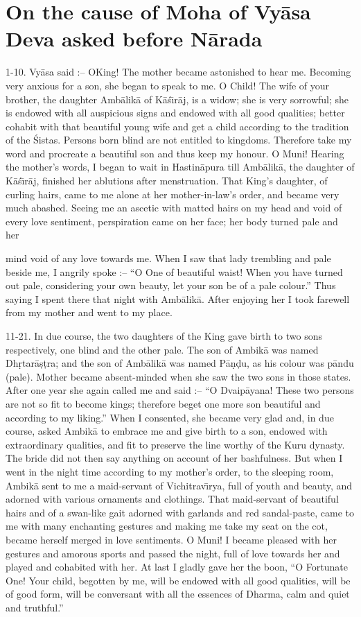 \chapter{On the cause of Moha of Vy\=asa Deva asked before N\=arada}

1-10. Vy\=asa said :-- OKing! The mother became astonished to hear me. Becoming very anxious for a son, she began to speak to me. O Child! The wife of your brother, the daughter Amb\=alik\=a of K\=a\'s\={\i}r\=aj, is a widow; she is very sorrowful; she is endowed with all auspicious signs and endowed with all good qualities; better cohabit with that beautiful young wife and get a child according to the tradition of the \'Sistas. Persons born blind are not entitled to kingdoms. Therefore take my word and procreate a beautiful son and thus keep my honour. O Muni! Hearing the mother's words, I began to wait in Hastin\=apura till Amb\=alik\=a, the daughter of K\=a\'s\={\i}r\=aj, finished her ablutions after menstruation. That King's daughter, of curling hairs, came to me alone at her mother-in-law's order, and became very much abashed. Seeing me an ascetic with matted hairs on my head and void of every love sentiment, perspiration came on her face; her body turned pale and her

mind void of any love towards me. When I saw that lady trembling and pale beside me, I angrily spoke :-- ``O One of beautiful waist! When you have turned out pale, considering your own beauty, let your son be of a pale colour.'' Thus saying I spent there that night with Amb\=alik\=a. After enjoying her I took farewell from my mother and went to my place.

11-21. In due course, the two daughters of the King gave birth to two sons respectively, one blind and the other pale. The son of Ambik\=a was named Dh\d{r}tar\=a\d{s}\d{t}ra; and the son of Amb\=alik\=a was named P\=a\d{n}\d{d}u, as his colour was p\=andu (pale). Mother became absent-minded when she saw the two sons in those states. After one year she again called me and said :-- ``O Dvaip\=ayana! These two persons are not so fit to become kings; therefore beget one more son beautiful and according to my liking.'' When I consented, she became very glad and, in due course, asked Ambik\=a to embrace me and give birth to a son, endowed with extraordinary qualities, and fit to preserve the line worthy of the Kuru dynasty. The bride did not then say anything on account of her bashfulness. But when I went in the night time according to my mother's order, to the sleeping room, Ambik\=a sent to me a maid-servant of Vichitrav\={\i}rya, full of youth and beauty, and adorned with various ornaments and clothings. That maid-servant of beautiful hairs and of a swan-like gait adorned with garlands and red sandal-paste, came to me with many enchanting gestures and making me take my seat on the cot, became herself merged in love sentiments. O Muni! I became pleased with her gestures and amorous sports and passed the night, full of love towards her and played and cohabited with her. At last I gladly gave her the boon, ``O Fortunate One! Your child, begotten by me, will be endowed with all good qualities, will be of good form, will be conversant with all the essences of Dharma, calm and quiet and truthful.''

